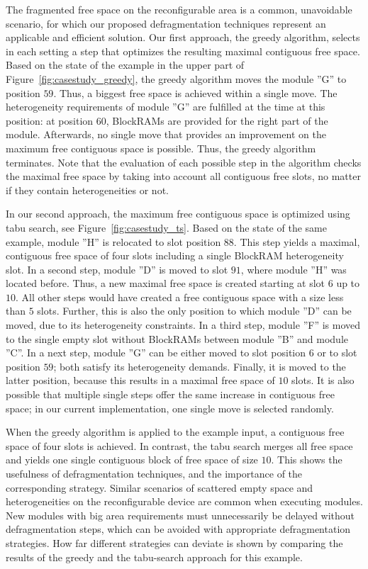 \documentclass{article}
\begin{document}
The fragmented free space on the reconfigurable area is a common,
unavoidable scenario, for which our proposed defragmentation
techniques represent an applicable and efficient solution. Our first
approach, the greedy algorithm, selects in each setting a step that
optimizes the resulting maximal contiguous free space. Based on the
state of the example in the upper part of Figure~\ref{fig:casestudy_greedy}, the
greedy algorithm moves the module ''G'' to position $59$. Thus, a
biggest free space is achieved within a single move. The
heterogeneity requirements of module ''G'' are fulfilled at the time
at this position: at position $60$, BlockRAMs are provided for the
right part of the module. Afterwards, no single move that
provides an improvement on the maximum free contiguous space is possible. Thus, the
greedy algorithm terminates. Note that the evaluation of each
possible step in the algorithm checks the maximal free space by taking
into account all contiguous free slots, no matter if they contain
heterogeneities or not.

In our second approach, the maximum free contiguous space is optimized
using tabu search, see Figure~\ref{fig:casestudy_ts}. Based on the state of the same example, module ''H'' is relocated to slot
position $88$. This step yields a maximal, contiguous free space of four slots
including a single BlockRAM heterogeneity slot. In a
second step, module ''D'' is moved to slot $91$, where module ''H''
was located before. Thus, a new maximal free space is created starting
at slot $6$ up to $10$. All other steps would have created a free
contiguous space with a size less than $5$ slots. Further, this is also the
only position to which module ''D'' can be moved, due to its heterogeneity
constraints. In a third step, module ''F'' is moved to the single
empty slot without BlockRAMs between module ''B'' and module ''C''. In
a next step, module ''G'' can be either moved to slot position $6$ or
to slot position $59$; both satisfy its heterogeneity
demands. Finally, it is moved to the latter position, because this
results in a maximal free space of $10$ slots. It is also possible
that multiple single steps offer the same increase in contiguous free
space; 
in our current implementation,  one single move is selected randomly.

When the greedy algorithm is applied to the example input, a
contiguous free space of four slots is achieved. In contrast, the
tabu search merges all free space and yields one single contiguous 
block of free space of size $10$. This shows
the usefulness of defragmentation techniques, and the importance of
the corresponding strategy. Similar scenarios of scattered empty space
and heterogeneities on the reconfigurable device are common when
executing modules. New modules with big area requirements must
unnecessarily be delayed without defragmentation steps, which can be
avoided with appropriate defragmentation strategies. How far different
strategies can deviate is shown by comparing the results of the greedy
and the tabu-search approach for this example.
\end{document}
